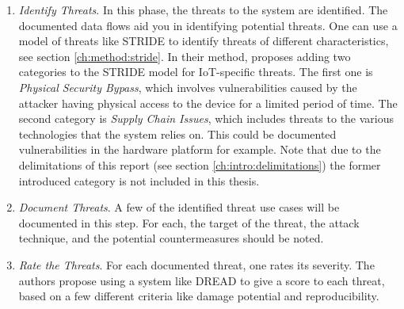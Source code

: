 \begin{enumerate}
    \item \textit{Identify Threats}. In this phase, the threats to the system are identified. The documented data flows aid you in identifying potential threats. One can use a model of threats like STRIDE \cite{stride} to identify threats of different characteristics, see section \ref{ch:method:stride}. In their method, \citeauthor{guzman2017iot} proposes adding two categories to the STRIDE model for IoT-specific threats. The first one is \textit{Physical Security Bypass}, which involves vulnerabilities caused by the attacker having physical access to the device for a limited period of time. The second category is \textit{Supply Chain Issues}, which includes threats to the various technologies that the system relies on. This could be documented vulnerabilities in the hardware platform for example. Note that due to the delimitations of this report (see section \ref{ch:intro:delimitations}) the former introduced category is not included in this thesis.
    
    \item \textit{Document Threats}. A few of the identified threat use cases will be documented in this step. For each, the target of the threat, the attack technique, and the potential countermeasures should be noted.
    
    \item \textit{Rate the Threats}. For each documented threat, one rates its severity. The authors propose using a system like DREAD to give a score to each threat, based on a few different criteria like damage potential and reproducibility.
\end{enumerate}

